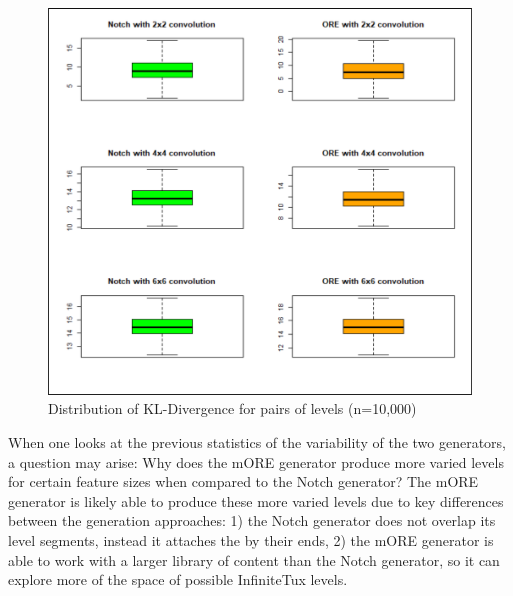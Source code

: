 \begin{figure}[ht]
    \centering
    \includegraphics[width=\linewidth]{img/fig16-boxplot.png}
    \caption{Distribution of KL-Divergence for pairs of levels (n=10,000)}
    \label{fig:boxplot}
\end{figure}

When one looks at the previous statistics of the variability of the two generators, a
question may arise: Why does the mORE generator produce more varied levels for certain
feature sizes when compared to the Notch generator? The mORE generator is likely able to 
produce these more varied levels due to key differences between the generation approaches:
1) the Notch generator does not overlap its level segments, instead it attaches the by
their ends, 2) the mORE generator is able to work with a larger library of content than the
Notch generator, so it can explore more of the space of possible InfiniteTux levels.

